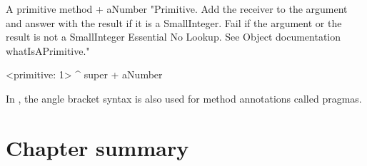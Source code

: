 \documentclass[a4paper,10pt,twoside]{book}
\begin{document}
\begin{method}[primitive]{A primitive method}
+ aNumber 
  "Primitive. Add the receiver to the argument and answer with the result
  if it is a SmallInteger. Fail if the argument or the result is not a
  SmallInteger  Essential  No Lookup. See Object documentation whatIsAPrimitive."

  <primitive: 1>
  ^ super + aNumber
\end{method}





In \pharo, the angle bracket syntax is also used for method annotations called pragmas.

\section{Chapter summary}
\end{document}
